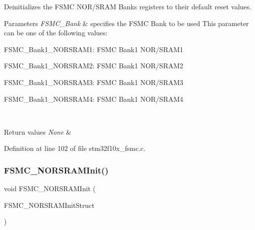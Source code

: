Deinitializes the F\+S\+MC N\+O\+R/\+S\+R\+AM Banks registers to their default reset values. 


\begin{DoxyParams}{Parameters}
{\em F\+S\+M\+C\+\_\+\+Bank} & specifies the F\+S\+MC Bank to be used This parameter can be one of the following values\+: \begin{DoxyItemize}
\item F\+S\+M\+C\+\_\+\+Bank1\+\_\+\+N\+O\+R\+S\+R\+A\+M1\+: F\+S\+MC Bank1 N\+O\+R/\+S\+R\+A\+M1 \item F\+S\+M\+C\+\_\+\+Bank1\+\_\+\+N\+O\+R\+S\+R\+A\+M2\+: F\+S\+MC Bank1 N\+O\+R/\+S\+R\+A\+M2 \item F\+S\+M\+C\+\_\+\+Bank1\+\_\+\+N\+O\+R\+S\+R\+A\+M3\+: F\+S\+MC Bank1 N\+O\+R/\+S\+R\+A\+M3 \item F\+S\+M\+C\+\_\+\+Bank1\+\_\+\+N\+O\+R\+S\+R\+A\+M4\+: F\+S\+MC Bank1 N\+O\+R/\+S\+R\+A\+M4 \end{DoxyItemize}
\\
\hline
\end{DoxyParams}

\begin{DoxyRetVals}{Return values}
{\em None} & \\
\hline
\end{DoxyRetVals}


Definition at line 102 of file stm32f10x\+\_\+fsmc.\+c.

\mbox{\label{group___f_s_m_c___private___functions_ga9c27816e8b17394c9ee1ce9298917b4a}} 
\subsubsection{\texorpdfstring{F\+S\+M\+C\+\_\+\+N\+O\+R\+S\+R\+A\+M\+Init()}{FSMC\_NORSRAMInit()}}
{\footnotesize\ttfamily void F\+S\+M\+C\+\_\+\+N\+O\+R\+S\+R\+A\+M\+Init (\begin{DoxyParamCaption}\item[{\hyperlink{struct_f_s_m_c___n_o_r_s_r_a_m_init_type_def}{F\+S\+M\+C\+\_\+\+N\+O\+R\+S\+R\+A\+M\+Init\+Type\+Def} $\ast$}]{F\+S\+M\+C\+\_\+\+N\+O\+R\+S\+R\+A\+M\+Init\+Struct }\end{DoxyParamCaption})}



